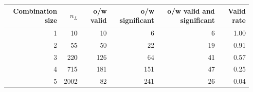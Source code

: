 \begin{tabular}{rrrrrr}
\toprule
Combination size & $n_L$ & o/w valid & o/w significant & o/w valid and significant & Valid rate \\
\midrule
1 & 10 & 10 & 6 & 6 & 1.00 \\
2 & 55 & 50 & 22 & 19 & 0.91 \\
3 & 220 & 126 & 64 & 41 & 0.57 \\
4 & 715 & 181 & 151 & 47 & 0.25 \\
5 & 2002 & 82 & 241 & 26 & 0.04 \\
\bottomrule
\end{tabular}
